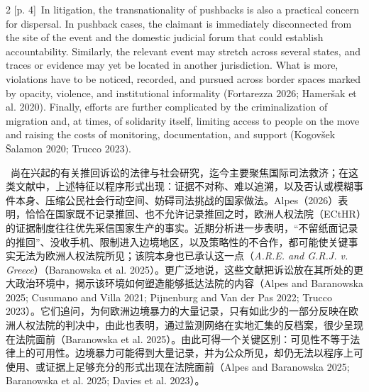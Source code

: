 \documentclass[10pt,a4paper]{article}
\begin{document}
\begin{paracol}{2}
{\scriptsize\color{gray} [p. 4]}\ In litigation, the transnationality of pushbacks is also a practical concern for dispersal. In pushback cases, the claimant is immediately disconnected from the site of the event and the domestic judicial forum that could establish accountability. Similarly, the relevant event may stretch across several states, and traces or evidence may yet be located in another jurisdiction. What is more, violations have to be noticed, recorded, and pursued across border spaces marked by opacity, violence, and institutional informality (Fortarezza 2026; Hameršak et al. 2020). Finally, efforts are further complicated by the criminalization of migration and, at times, of solidarity itself, limiting access to people on the move and raising the costs of monitoring, documentation, and support (Kogovšek Šalamon 2020; Trucco 2023).\par
\switchcolumn*
{\scriptsize\color{gray} [p. 4]}\ 尚在兴起的有关推回诉讼的法律与社会研究，迄今主要聚焦国际司法救济；在这类文献中，上述特征以程序形式出现：证据不对称、难以追溯，以及否认或模糊事件本身、压缩公民社会行动空间、妨碍司法挑战的国家做法。Alpes（2026）表明，恰恰在国家既不记录推回、也不允许记录推回之时，欧洲人权法院（ECtHR）的证据制度往往优先采信国家生产的事实。近期分析进一步表明，“不留纸面记录的推回”、没收手机、限制进入边境地区，以及策略性的不合作，都可能使关键事实无法为欧洲人权法院所见；该院本身也已承认这一点（\textit{A.R.E. and G.R.J. v. Greece}）（Baranowska et al. 2025）。更广泛地说，这些文献把诉讼放在其所处的更大政治环境中，揭示该环境如何塑造能够抵达法院的内容（Alpes and Baranowska 2025; Cusumano and Villa 2021; Pijnenburg and Van der Pas 2022; Trucco 2023）。它们追问，为何欧洲边境暴力的大量记录，只有如此少的一部分反映在欧洲人权法院的判决中，由此也表明，通过监测网络在实地汇集的反档案，很少呈现在法院面前（Baranowska et al. 2025）。由此可得一个关键区别：可见性不等于法律上的可用性。边境暴力可能得到大量记录，并为公众所见，却仍无法以程序上可使用、或证据上足够充分的形式出现在法院面前（Alpes and Baranowska 2025; Baranowska et al. 2025; Davies et al. 2023）。\par
\switchcolumn

\end{paracol}
\end{document}
